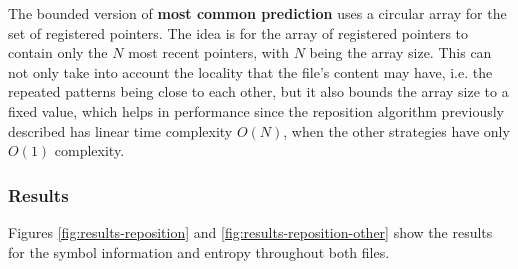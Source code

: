 \documentclass{article}
\begin{document}
The bounded version of \textbf{most common prediction} uses a circular array for the set of registered pointers.
The idea is for the array of registered pointers to contain only the $N$ most recent pointers, with $N$ being the array size.
This can not only take into account the locality that the file's content may have, i.e. the repeated patterns being close to each other, but it also bounds the array size to a fixed value, which helps in performance since the reposition algorithm previously described has linear time complexity $O(N)$, when the other strategies have only $O(1)$ complexity.

\subsubsection{Results}

Figures \ref{fig:results-reposition} and \ref{fig:results-reposition-other} show the results for the symbol information and entropy throughout both files.
\end{document}
